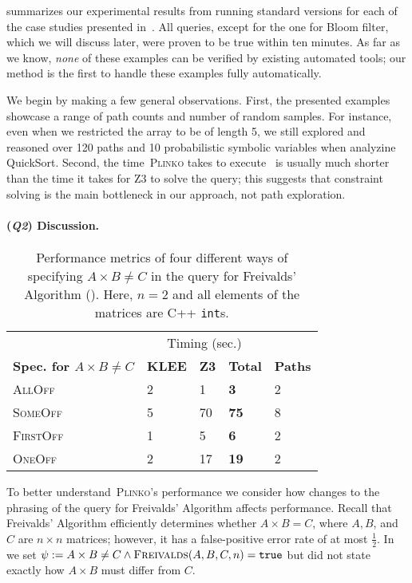 \documentclass[acmsmall,review,anonymous]{acmart}\settopmatter{printfolios=true,printccs=false,printacmref=false}
\newcommand{\SYSTEM}{\textsc{Plinko}\xspace}
\newcommand{\Q}[1]{(\textit{\textbf{Q#1}})}
\begin{document}
 summarizes our experimental results from running standard versions for each of the case studies presented in~.
% 
All queries, except for the one for Bloom filter, which we will discuss later, were proven to be true within ten minutes.
%
As far as we know, \emph{none} of these examples can be verified by existing
automated tools; our method is the first to handle these examples fully
automatically.

We begin by making a few general observations.
% 
First, the presented examples showcase a range of path counts and number of random samples.
% 
For instance, even when we restricted the array to be of length 5, we still explored and reasoned over 120 paths and 10 probabilistic symbolic variables when analyzine QuickSort.
% 
Second, the time~\SYSTEM takes to execute~ is usually much shorter than the time it takes for Z3 to solve the query; this suggests that constraint solving is the main bottleneck in our approach, not path exploration.

\paragraph*{\Q{2} Discussion.}

\begin{table}
  \centering
  \caption{Performance metrics of four different ways of specifying $A \times B \neq C$ in the query for Freivalds' Algorithm (). Here, $n=2$ and all elements of the matrices are C++ \texttt{int}s.}
  \label{tab:q2}
  \begin{tabular}{@{}lllll@{}}
    \toprule
    & \multicolumn{3}{c}{Timing (sec.)} &\\ \cmidrule{2-4}
    \textbf{Spec. for $A \times B \neq C$} & \textbf{KLEE} & \textbf{Z3} & \textbf{Total} & \textbf{Paths}\\ \midrule
    \textsc{AllOff} & 2 & 1 & \textbf{3} & 2\\
    \textsc{SomeOff}& 5 & 70 & \textbf{75} & 8\\
    \textsc{FirstOff}& 1 & 5 & \textbf{6} & 2\\
    \textsc{OneOff} & 2 & 17 & \textbf{19} & 2\\
    \bottomrule
  \end{tabular}
\end{table}
To better understand~\SYSTEM's performance we consider how changes to the phrasing of the query for Freivalds' Algorithm affects performance.
% 
Recall that Freivalds' Algorithm efficiently determines whether $A \times B = C$, where $A,B$, and $C$ are $n \times n$ matrices; however, it has a false-positive error rate of at most $\frac{1}{2}$.
% 
In~ we set $\psi := A \times B \neq C \wedge \textsc{Freivalds}(A,B,C,n) = \mathtt{true}$ but did not state exactly how $A \times B$ must differ from $C$.
 
\end{document}

